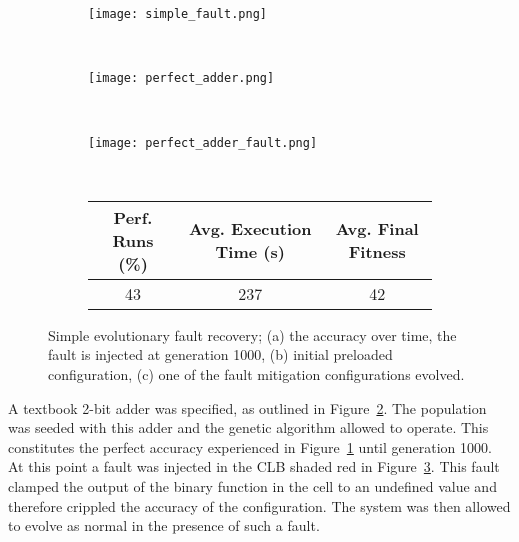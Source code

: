 \begin{figure}
	\centering
	\begin{subfigure}[ht]{0.49\textwidth}
		\texttt{[image: simple\_fault.png]}
		\caption{}
		\label{fig:fault}
		\vspace{1em}
	\end{subfigure}
	\\
	\begin{subfigure}[ht]{0.49\textwidth}
		\texttt{[image: perfect\_adder.png]}
		\caption{}
		\label{fig:perf}
		\vspace{1em}
	\end{subfigure}
	~
	\begin{subfigure}[ht]{0.49\textwidth}
		\texttt{[image: perfect\_adder\_fault.png]}
		\caption{}
		\label{fig:recov}
		\vspace{1em}
	\end{subfigure}
	~
	\begin{subfigure}[ht]{\textwidth}
		\centering
		\begin{tabular}{ccc}
			\toprule
			\bfseries{Perf. Runs (\%)} &
			\bfseries{Avg. Execution Time (s)} & \bfseries{Avg. Final Fitness}\\
			\midrule
			43 & 237 & 42 \\
			\bottomrule
		\end{tabular}
	\end{subfigure}
	\caption[Simple evolutionary fault recovery]{Simple evolutionary fault recovery;
	(a) the accuracy over time, the fault is injected at generation 1000,
	(b) initial preloaded configuration,
	(c) one of the fault mitigation configurations evolved.}
\end{figure}

A textbook 2-bit adder was specified, as outlined in Figure~\ref{fig:perf}. The
population was seeded with this adder and the genetic algorithm allowed to operate.
This constitutes the perfect accuracy experienced in Figure~\ref{fig:fault} until generation
1000.
At this point a fault was injected in the CLB shaded red in Figure~\ref{fig:recov}.
This fault clamped the output of the binary function in the cell to an undefined
value and therefore crippled the accuracy of the configuration. The system was then
allowed to evolve as normal in the presence of such a fault.

